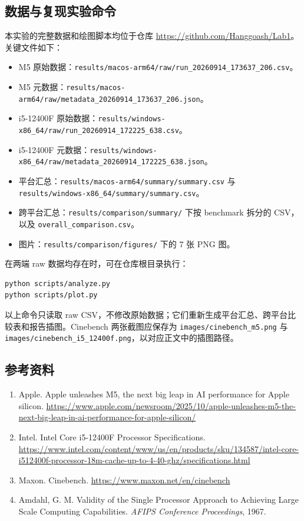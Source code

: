 \documentclass[UTF8,a4paper,12pt]{ctexart}
\begin{document}
\subsection{数据与复现实验命令}

本实验的完整数据和绘图脚本均位于仓库 \url{https://github.com/Hanggoash/Lab1}。关键文件如下：

\begin{itemize}
\item M5 原始数据：\texttt{results/macos-arm64/raw/run\_20260914\_173637\_206.csv}。
\item M5 元数据：\texttt{results/macos-arm64/raw/metadata\_20260914\_173637\_206.json}。
\item i5-12400F 原始数据：\texttt{results/windows-x86\_64/raw/run\_20260914\_172225\_638.csv}。
\item i5-12400F 元数据：\texttt{results/windows-x86\_64/raw/metadata\_20260914\_172225\_638.json}。
\item 平台汇总：\texttt{results/macos-arm64/summary/summary.csv} 与 \texttt{results/windows-x86\_64/summary/summary.csv}。
\item 跨平台汇总：\texttt{results/comparison/summary/} 下按 benchmark 拆分的 CSV，以及 \texttt{overall\_comparison.csv}。
\item 图片：\texttt{results/comparison/figures/} 下的 7 张 PNG 图。
\end{itemize}

在两端 raw 数据均存在时，可在仓库根目录执行：

\begin{lstlisting}
python scripts/analyze.py
python scripts/plot.py
\end{lstlisting}

以上命令只读取 raw CSV，不修改原始数据；它们重新生成平台汇总、跨平台比较表和报告插图。Cinebench 两张截图应保存为 \texttt{images/cinebench\_m5.png} 与 \texttt{images/cinebench\_i5\_12400f.png}，以对应正文中的插图路径。

\subsection{参考资料}

\begin{enumerate}[label={\arabic*.}]
\item Apple. Apple unleashes M5, the next big leap in AI performance for Apple silicon. \url{https://www.apple.com/newsroom/2025/10/apple-unleashes-m5-the-next-big-leap-in-ai-performance-for-apple-silicon/}
\item Intel. Intel Core i5-12400F Processor Specifications. \url{https://www.intel.com/content/www/us/en/products/sku/134587/intel-core-i512400f-processor-18m-cache-up-to-4-40-ghz/specifications.html}
\item Maxon. Cinebench. \url{https://www.maxon.net/en/cinebench}
\item Amdahl, G. M. Validity of the Single Processor Approach to Achieving Large Scale Computing Capabilities. \textit{AFIPS Conference Proceedings}, 1967.
\end{enumerate}
\end{document}
